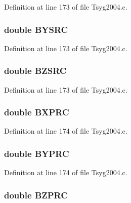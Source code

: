 Definition at line 173 of file Tsyg2004.c.\hypertarget{struct___t_s04_info_32f55c83dc6f14a4cbdb08ce786d5c09}{
\subsubsection[{BYSRC}]{\setlength{\rightskip}{0pt plus 5cm}double {\bf BYSRC}}}
\label{struct___t_s04_info_32f55c83dc6f14a4cbdb08ce786d5c09}




Definition at line 173 of file Tsyg2004.c.\hypertarget{struct___t_s04_info_4d8bb430b345437be7bdcdab9f669a83}{
\subsubsection[{BZSRC}]{\setlength{\rightskip}{0pt plus 5cm}double {\bf BZSRC}}}
\label{struct___t_s04_info_4d8bb430b345437be7bdcdab9f669a83}




Definition at line 173 of file Tsyg2004.c.\hypertarget{struct___t_s04_info_56d8d2c3e40e106b3e7bbc3fc834460a}{
\subsubsection[{BXPRC}]{\setlength{\rightskip}{0pt plus 5cm}double {\bf BXPRC}}}
\label{struct___t_s04_info_56d8d2c3e40e106b3e7bbc3fc834460a}




Definition at line 174 of file Tsyg2004.c.\hypertarget{struct___t_s04_info_5f4117e80f0ac1412d3ce2159ff02138}{
\subsubsection[{BYPRC}]{\setlength{\rightskip}{0pt plus 5cm}double {\bf BYPRC}}}
\label{struct___t_s04_info_5f4117e80f0ac1412d3ce2159ff02138}




Definition at line 174 of file Tsyg2004.c.\hypertarget{struct___t_s04_info_f988231e05be0d94639c1b8ba1ce76a5}{
\subsubsection[{BZPRC}]{\setlength{\rightskip}{0pt plus 5cm}double {\bf BZPRC}}}
\label{struct___t_s04_info_f988231e05be0d94639c1b8ba1ce76a5}




